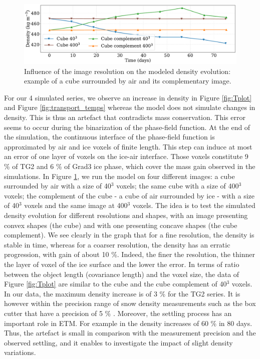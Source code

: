 \documentclass[draft,ms]{agujournal2019}
\begin{document}
\begin{figure}
    \centering
    \includegraphics[width=0.9\linewidth]{Figures/cubes_compl_density_propre.pdf}
    \caption{Influence of the image resolution on the modeled density evolution: example of a cube surrounded by air and its complementary image.}
    \label{fig:cubes}
\end{figure}

For our 4 simulated series, we observe an increase in density in Figure \ref{fig:Tplot} and Figure \ref{fig:transport_temps} whereas the model does not simulate changes in density. This is thus an artefact that contradicts mass conservation. This error seems to occur during the binarization of the phase-field function. At the end of the simulation, the continuous interface of the phase-field function is approximated by air and ice voxels of finite length. This step can induce at most an error of one layer of voxels on the ice-air interface. Those voxels constitute 9 \% of TG2 and 6 \% of Grad3 ice phase, which cover the mass gain observed in the simulations. In Figure \ref{fig:cubes}, we run the model on four different images: a cube surrounded by air with a size of 40$^3$ voxels; the same cube with a size of 400$^3$ voxels; the complement of the cube - a cube of air surrounded by ice - with a size of 40$^3$ voxels and the same image at 400$^3$ voxels. The idea is to test the simulated density evolution for different resolutions and shapes, with an image presenting convex shapes (the cube) and with one presenting concave shapes (the cube complement). We see clearly in the graph that for a fine resolution, the density is stable in time, whereas for a coarser resolution, the density has an erratic progression, with gain of about 10 \%. Indeed, the finer the resolution, the thinner the layer of voxel of the ice surface and the lower the error. In terms of ratio between the object length (covariance length) and the voxel size, the data of Figure \ref{fig:Tplot} are similar to the cube and the cube complement of 40$^3$ voxels. %
In our data, the maximum density increase is of 3 \% for the TG2 series. It is however within the precision range of snow density measurements such as the box cutter that have a precision of 5 \% \cite{proksch2016intercomparison}. Moreover, the settling process has an important role in ETM. For example in  the density increases of 60 \% in 80 days. Thus, the artefact is small in comparison with the measurement precision and the observed settling, and it enables to investigate the impact of slight density variations.\\
\end{document}
